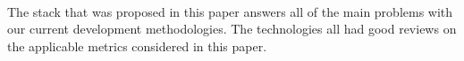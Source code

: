 \documentclass{turabian-researchpaper}
\begin{document}
 \paragraph{}
The stack that was proposed in this paper answers all of the main problems with our current development methodologies. The technologies all had good reviews on the applicable metrics considered in this paper. 
\par
\endsection


\clearpage

\end{document}
